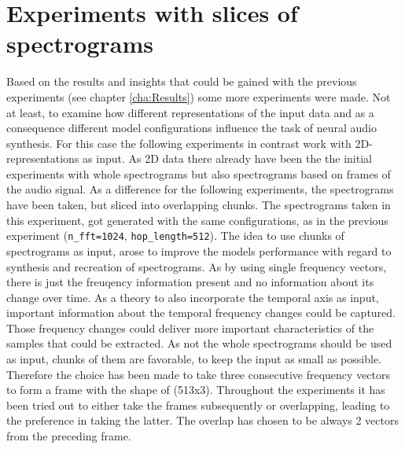 \section{Experiments with slices of spectrograms}
Based on the results and insights that could be gained with the previous experiments (see chapter \ref{cha:Results}) some more experiments were made. Not at least, to examine how different representations of the input data and as a consequence different model configurations influence the task of neural audio synthesis. For this case the following experiments in contrast work with 2D-representations as input. As 2D data there already have been the the initial experiments with whole spectrograms but also spectrograms based on frames of the audio signal. As a difference for the following experiments, the spectrograms have been taken, but sliced into overlapping chunks. The spectrograms taken in this experiment, got generated with the same configurations, as in the previous experiment (\texttt{n\_fft=1024}, \texttt{hop\_length=512}). The idea to use chunks of spectrograms as input, arose to improve the models performance with regard to synthesis and recreation of spectrograms. As by using single frequency vectors, there is just the freuqency information present and no information about its change over time. As a theory to also incorporate the temporal axis as input, important information about the temporal frequency changes could be captured. Those frequency changes could deliver more important characteristics of the samples that could be extracted. As not the whole spectrograms should be used as input, chunks of them are favorable, to keep the input as small as possible. Therefore the choice has been made to take three consecutive frequency vectors to form a frame with the shape of (513x3). Throughout the experiments it has been tried out to either take the frames subsequently or overlapping, leading to the preference in taking the latter. The overlap has chosen to be always 2 vectors from the preceding frame. 

